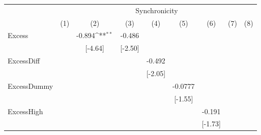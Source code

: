 {
\def\sym#1{\ifmmode^{#1}\else\(^{#1}\)\fi}
\begin{tabular}{l*{8}{c}}
\hline\hline
                    &\multicolumn{8}{c}{Synchronicity}                                                                                                                                              \\\cmidrule(lr){2-9}
                    &\multicolumn{1}{c}{(1)}         &\multicolumn{1}{c}{(2)}         &\multicolumn{1}{c}{(3)}         &\multicolumn{1}{c}{(4)}         &\multicolumn{1}{c}{(5)}         &\multicolumn{1}{c}{(6)}         &\multicolumn{1}{c}{(7)}         &\multicolumn{1}{c}{(8)}         \\
\hline
Excess              &                     &      -0.894\sym{**} &      -0.486         &                     &                     &                     &                     &                     \\
                    &                     &     [-4.64]         &     [-2.50]         &                     &                     &                     &                     &                     \\
[1em]
ExcessDiff          &                     &                     &                     &      -0.492         &                     &                     &                     &                     \\
                    &                     &                     &                     &     [-2.05]         &                     &                     &                     &                     \\
[1em]
ExcessDummy         &                     &                     &                     &                     &     -0.0777         &                     &                     &                     \\
                    &                     &                     &                     &                     &     [-1.55]         &                     &                     &                     \\
[1em]
ExcessHigh          &                     &                     &                     &                     &                     &      -0.191         &                     &                     \\
                    &                     &                     &                     &                     &                     &     [-1.73]         &                     &                     \\

\end{tabular}}
